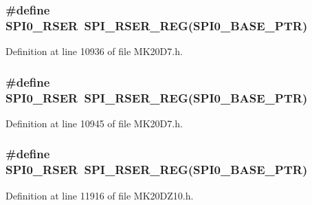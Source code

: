 \subsubsection[{\texorpdfstring{S\+P\+I0\+\_\+\+R\+S\+ER}{SPI0_RSER}}]{\setlength{\rightskip}{0pt plus 5cm}\#define S\+P\+I0\+\_\+\+R\+S\+ER~{\bf S\+P\+I\+\_\+\+R\+S\+E\+R\+\_\+\+R\+EG}({\bf S\+P\+I0\+\_\+\+B\+A\+S\+E\+\_\+\+P\+TR})}\hypertarget{group___s_p_i___register___accessor___macros_ga614a52874363ff4724a035362b2ffe1c}{}\label{group___s_p_i___register___accessor___macros_ga614a52874363ff4724a035362b2ffe1c}


Definition at line 10936 of file M\+K20\+D7.\+h.

\subsubsection[{\texorpdfstring{S\+P\+I0\+\_\+\+R\+S\+ER}{SPI0_RSER}}]{\setlength{\rightskip}{0pt plus 5cm}\#define S\+P\+I0\+\_\+\+R\+S\+ER~{\bf S\+P\+I\+\_\+\+R\+S\+E\+R\+\_\+\+R\+EG}({\bf S\+P\+I0\+\_\+\+B\+A\+S\+E\+\_\+\+P\+TR})}\hypertarget{group___s_p_i___register___accessor___macros_ga614a52874363ff4724a035362b2ffe1c}{}\label{group___s_p_i___register___accessor___macros_ga614a52874363ff4724a035362b2ffe1c}


Definition at line 10945 of file M\+K20\+D7.\+h.

\subsubsection[{\texorpdfstring{S\+P\+I0\+\_\+\+R\+S\+ER}{SPI0_RSER}}]{\setlength{\rightskip}{0pt plus 5cm}\#define S\+P\+I0\+\_\+\+R\+S\+ER~{\bf S\+P\+I\+\_\+\+R\+S\+E\+R\+\_\+\+R\+EG}({\bf S\+P\+I0\+\_\+\+B\+A\+S\+E\+\_\+\+P\+TR})}\hypertarget{group___s_p_i___register___accessor___macros_ga614a52874363ff4724a035362b2ffe1c}{}\label{group___s_p_i___register___accessor___macros_ga614a52874363ff4724a035362b2ffe1c}


Definition at line 11916 of file M\+K20\+D\+Z10.\+h.

